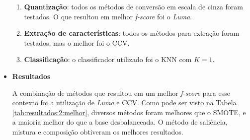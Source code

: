 \begin{itemize}
\begin{enumerate}
\item \textbf{Quantização}: todos os métodos de conversão em escala de cinza foram testados. O que resultou em melhor \textit{f-score} foi o \emph{Luma}.

\item \textbf{Extração de características}: todos os métodos para extração foram testados, mas o melhor foi o CCV.

\item \textbf{Classificação}: o classificador utilizado foi o KNN com $K=1$.
\end{enumerate}

\item[] \textbf{Resultados}

A combinação de métodos que resultou em um melhor \textit{f-score} para esse contexto foi a utilização de \emph{Luma} e CCV. Como pode ser visto na Tabela \ref{tab:resultados:2:melhor}, diversos métodos foram melhores que o SMOTE, e a maioria melhor do que a base desbalanceada. O método de saliência, mistura e composição obtiveram os melhores resultados.




\end{itemize}
